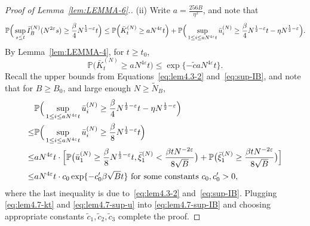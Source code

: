 \documentclass[11pt, reqno]{article}
\numberwithin{equation}{section}
\numberwithin{theorem}{section}
\begin{document}
\begin{appendix}
\begin{proof}[Proof of Lemma~\ref{lem:LEMMA-6}.]
\noindent (ii)
 Write $a=\frac{256B}{\eta^2}$, and note that %
    \begin{equation}\label{eq:lem4.7-sup-IB}
        \mathbb{P}\Big(\sup_{s\leq t}\Bar{I}_B^{(N)}(N^{2\varepsilon}s)\geq \frac{\beta}{4}N^{\frac{1}{2}-\varepsilon}t\Big)
        \leq \mathbb{P}\Big(\bar{K}^{(N)}_t\geq a N^{4\varepsilon}t\Big)+\mathbb{P}\Big(\sup_{1\leq i\leq aN^{4\varepsilon}t}\Bar{u}^{(N)}_i\geq \frac{\beta}{4}N^{\frac{1}{2}-\varepsilon}t - \eta N^{\frac{1}{2}-\varepsilon}\Big).
    \end{equation}
    By Lemma~\ref{lem:LEMMA-4}, for $t\geq t_0$, 
\begin{equation}\label{eq:lem4.7-kt}
    \mathbb{P}\big(\bar{K}^{(N)}_t\geq a N^{4\varepsilon}t\big)\leq \exp \{-\tilde{c}aN^{4\varepsilon}t\}.
\end{equation}
Recall the upper bounds from Equations~\eqref{eq:lem4.3-2} and~\eqref{eq:sup-IB}, and note that for $B\geq B_0$, and large enough $N\geq \tilde N_B$,
\begin{align}\label{eq:lem4.7-sup-u}
&\mathbb{P}\Big(\sup_{1\leq i\leq aN^{4\varepsilon}t}\Bar{u}^{(N)}_i\geq \frac{\beta}{4}N^{\frac{1}{2}-\varepsilon}t - \eta N^{\frac{1}{2}-\varepsilon}\Big)\nonumber\\
    \le&\mathbb{P}\Big(\sup_{1\leq i\leq aN^{4\varepsilon}t}\Bar{u}^{(N)}_i\geq \frac{\beta}{8}N^{\frac{1}{2}-\varepsilon}t\Big)\nonumber\\
    \leq& aN^{4\varepsilon}t\cdot\Big[\mathbb{P}\big(\Bar{u}^{(N)}_1\geq \frac{\beta}{8}N^{\frac{1}{2}-\varepsilon}t, \bar{\xi}^{(N)}_1< \frac{\beta tN^{-2\varepsilon}}{8\sqrt{B}}\big)+\mathbb{P}\big(\bar{\xi}^{(N)}_1\geq \frac{\beta t N^{-2\varepsilon}}{8\sqrt{B}}\big)\Big]\nonumber\\
    \leq& aN^{4\varepsilon}t\cdot c_0 \exp \{-c'_0 \beta\sqrt{B} t\}\text{ for some constants }c_0, c'_0>0,
\end{align}
where the last inequality is due to~\eqref{eq:lem4.3-2} and~\eqref{eq:sup-IB}.
Plugging \eqref{eq:lem4.7-kt} and \eqref{eq:lem4.7-sup-u} into \eqref{eq:lem4.7-sup-IB} and choosing appropriate constants $\tilde{c}_1,\tilde{c}_2,\tilde{c}_3$ complete the proof.
\end{proof}


\end{appendix}
\end{document}
